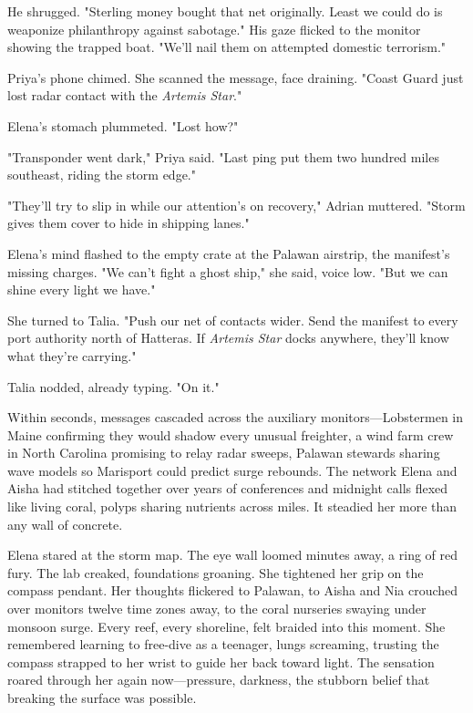 He shrugged. "Sterling money bought that net originally. Least we could do is weaponize philanthropy against sabotage." His gaze flicked to the monitor showing the trapped boat. "We'll nail them on attempted domestic terrorism."

Priya's phone chimed. She scanned the message, face draining. "Coast Guard just lost radar contact with the \textit{Artemis Star}."

Elena's stomach plummeted. "Lost how?"

"Transponder went dark," Priya said. "Last ping put them two hundred miles southeast, riding the storm edge."

"They'll try to slip in while our attention's on recovery," Adrian muttered. "Storm gives them cover to hide in shipping lanes."

Elena's mind flashed to the empty crate at the Palawan airstrip, the manifest's missing charges. "We can't fight a ghost ship," she said, voice low. "But we can shine every light we have."

She turned to Talia. "Push our net of contacts wider. Send the manifest to every port authority north of Hatteras. If \textit{Artemis Star} docks anywhere, they'll know what they're carrying."

Talia nodded, already typing. "On it."

Within seconds, messages cascaded across the auxiliary monitors—Lobstermen in Maine confirming they would shadow every unusual freighter, a wind farm crew in North Carolina promising to relay radar sweeps, Palawan stewards sharing wave models so Marisport could predict surge rebounds. The network Elena and Aisha had stitched together over years of conferences and midnight calls flexed like living coral, polyps sharing nutrients across miles. It steadied her more than any wall of concrete.

Elena stared at the storm map. The eye wall loomed minutes away, a ring of red fury. The lab creaked, foundations groaning. She tightened her grip on the compass pendant. Her thoughts flickered to Palawan, to Aisha and Nia crouched over monitors twelve time zones away, to the coral nurseries swaying under monsoon surge. Every reef, every shoreline, felt braided into this moment. She remembered learning to free-dive as a teenager, lungs screaming, trusting the compass strapped to her wrist to guide her back toward light. The sensation roared through her again now—pressure, darkness, the stubborn belief that breaking the surface was possible.

